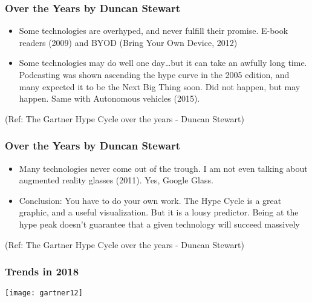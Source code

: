 \begin{frame}[fragile]\frametitle{Over the Years by Duncan Stewart}


\begin{itemize}
\item Some technologies are overhyped, and never fulfill their promise. E-book readers (2009) and BYOD (Bring Your Own Device, 2012)

\item Some technologies may do well one day…but it can take an awfully long time. Podcasting was shown ascending the hype curve in the 2005 edition, and many expected it to be the Next Big Thing soon. Did not happen, but may happen. Same with Autonomous vehicles (2015).
\end{itemize}

{\tiny (Ref: The Gartner Hype Cycle over the years - Duncan Stewart)}


\end{frame}

\begin{frame}[fragile]\frametitle{Over the Years by Duncan Stewart}


\begin{itemize}
\item Many technologies never come out of the trough. I am not even talking about augmented reality glasses (2011). Yes, Google Glass.

\item Conclusion: You have to do your own work. The Hype Cycle is a great graphic, and a useful visualization. But it is a lousy predictor. Being at the hype peak doesn’t guarantee that a given technology will succeed massively
\end{itemize}

{\tiny (Ref: The Gartner Hype Cycle over the years - Duncan Stewart)}


\end{frame}

\begin{frame}[fragile]\frametitle{Trends in 2018}

\begin{center}
\texttt{[image: gartner12]}
\end{center}


\end{frame}

